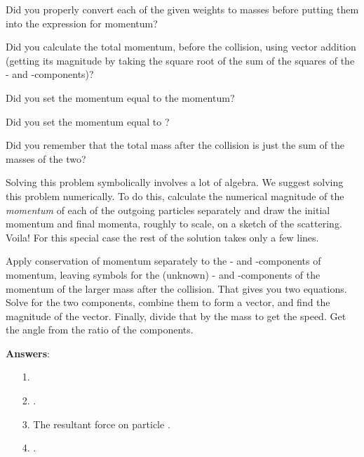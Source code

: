 {
{\begin{one-digit-list}
 \item [1.] Did you properly convert each of the given weights to masses before
            putting them into the expression for momentum?
 \item [2.] Did you calculate the total momentum, before the collision, using
            vector addition (getting its magnitude by taking the square root of
            the sum of the squares of the - and -components)?
 \item [3.] Did you set the  momentum equal to the  momentum?
 \item [4.] Did you set the  momentum equal to ?
 \item [5.] Did you remember that the total mass after the collision is just
            the sum of the masses of the two?
 \end{one-digit-list}
}

{Solving this problem symbolically involves a lot of algebra.
 We suggest solving this problem numerically.
 To do this, calculate the numerical magnitude of the {\em momentum} of each of
 the outgoing particles separately and draw the initial momentum and final
 momenta, roughly to scale, on a sketch of the scattering.
 Voila!
 For this special case the rest of the solution takes only a few lines.
}

{Apply conservation of momentum separately to the - and -components of
 momentum, leaving symbols for the (unknown) - and -components of the
 momentum of the larger mass after the collision.
 That gives you two equations.
 Solve for the two components, combine them to form a vector, and find the
 magnitude of the vector.
 Finally, divide that by the mass to get the speed.
 Get the angle from the ratio of the components. 
}

{{\bf Answers}:

\begin{itemize}
\item [1.] 

\item [2.] .
\item [3.] The resultant force on particle .

\item [4.] .


\end{itemize}}}
